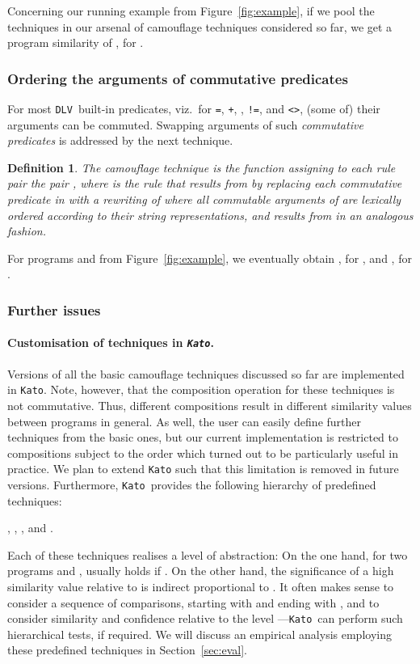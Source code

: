 \documentclass{tlp}
\newcommand{\dlv}{\texttt{DLV}\xspace}
\newcommand{\kato}[0]{\texttt{Kato}\xspace}
\newtheorem{definition}{Definition}
\begin{document}
Concerning our running example from Figure~\ref{fig:example},
if we pool the techniques in our  arsenal of camouflage techniques considered so far, we get a program similarity of
, for .

\subsubsection{Ordering the arguments of commutative predicates}
For most \dlv\ built-in predicates, viz.\ for {\tt =}, {\tt +}, {\tt *}, 
{\tt !=}, and {\tt <>}, (some of) their arguments can be commuted. 
Swapping arguments of such \emph{commutative predicates} is addressed by the  next technique.

\begin{definition}\label{def:swapping}
The camouflage technique  is the function assigning to each rule pair  the pair
,
where   is the rule that results from   by replacing each commutative predicate  in 
 with  a rewriting of  where all commutable arguments of  are lexically ordered according to their
string representations, and  results from  in an analogous fashion. 
\end{definition}
 
For programs  and  from  Figure~\ref{fig:example},
we eventually obtain , for ,
and  , for .

\subsubsection{Further issues}
\paragraph{Customisation of techniques in {\em \kato}.}
Versions of all the basic camouflage techniques discussed so far are implemented in \kato. 
Note, however, that the composition operation for these techniques
is not commutative.
Thus, different compositions result in different similarity values between programs in general.
As well, the user can easily define further techniques from the basic ones, but our current implementation is restricted to compositions subject to the order
 which turned out to be particularly useful in practice.
We plan to extend \kato such that this limitation is removed in future versions.
Furthermore, \kato\ provides the following hierarchy of predefined techniques:
\begin{center}
, , , and .
\end{center}
Each of these techniques realises a level
of abstraction: On the one hand, for two programs  and , usually 
 holds  if 
. 
On the other hand,  the significance of a high similarity value relative to  is indirect proportional to .
It often makes sense to consider a sequence of comparisons, starting with  and ending with , and to consider
similarity and confidence relative to the level ---\kato\
can perform such hierarchical tests, if required.
We will discuss an empirical analysis employing these predefined techniques in Section~\ref{sec:eval}.
\end{document}
